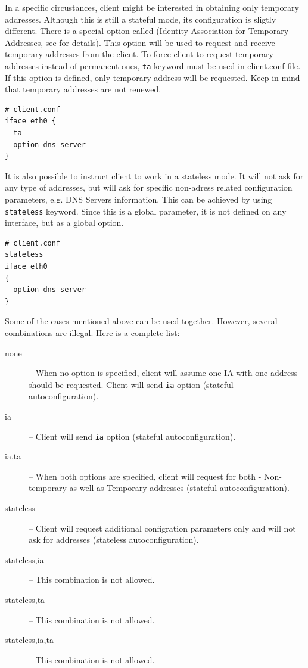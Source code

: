In a specific circustances, client might be interested in obtaining
only temporary addresses. Although this is still a stateful mode, its
configuration is sligtly different. There is a special option called 
(Identity Association for Temporary Addresses, see \cite{rfc3315} for
details). This option will be used to request and receive temporary
addresses from the client. To force client to request temporary
addresses instead of permanent ones, \verb+ta+ keyword must be used in
client.conf file. If this option is defined, only temporary address
will be requested. Keep in mind that temporary addresses are not
renewed.

\begin{lstlisting}
# client.conf
iface eth0 {
  ta
  option dns-server
}
\end{lstlisting}

It is also possible to instruct client to work in a stateless mode. It
will not ask for any type of addresses, but will ask for specific
non-adress related configuration parameters, e.g. DNS Servers
information. This can be achieved by using \verb+stateless+
keyword. Since this is a global parameter, it is not defined on any
interface, but as a global option.

\begin{lstlisting}
# client.conf
stateless
iface eth0
{
  option dns-server
}
\end{lstlisting}

Some of the cases mentioned above can be used together. However,
several combinations are illegal. Here is a complete list:
\begin{description}
\item[none] -- When no option is specified, client will assume one IA
	   with one address should be requested. Client will send
	   \verb+ia+ option (stateful autoconfiguration).
\item[ia] -- Client will send \verb+ia+ option (stateful
  autoconfiguration).
\item[ia,ta] -- When both options are specified, client will request
  for both - Non-temporary as well as Temporary addresses (stateful
  autoconfiguration).
\item[stateless] -- Client will request additional configration
  parameters only and will not ask for addresses (stateless
  autoconfiguration).
\item[stateless,ia] -- This combination is not allowed.
\item[stateless,ta] -- This combination is not allowed.
\item[stateless,ia,ta] -- This combination is not allowed.
\end{description}

